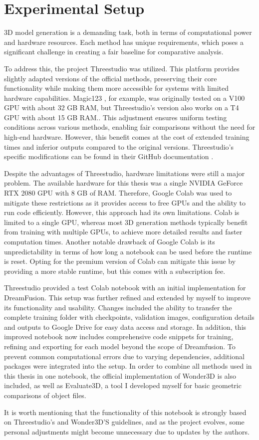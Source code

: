 \section{Experimental Setup}\label{Setup}

3D model generation is a demanding task, both in terms of computational power and hardware resources. Each method has unique requirements, which poses a significant challenge in creating a fair baseline for comparative analysis.

To address this, the project Threestudio \citep{threestudio2023} was utilized. This platform provides slightly adapted versions of the official methods, preserving their core functionality while making them more accessible for systems with limited hardware capabilities. Magic123 \citep{qian2023magic123}, for example, was originally tested on a V100 GPU with about 32 GB RAM, but Threestudio's version also works on a T4 GPU with about 15 GB RAM.\@. This adjustment ensures uniform testing conditions across various methods, enabling fair comparisons without the need for high-end hardware. However, this benefit comes at the cost of extended training times and inferior outputs compared to the original versions. Threestudio's specific modifications can be found in their GitHub documentation \citep{threestudio2023}.

Despite the advantages of Threestudio, hardware limitations were still a major problem. The available hardware for this thesis was a single NVIDIA GeForce RTX 2080 GPU with 8 GB of RAM\@. Therefore, Google Colab \citep{googlecolab} was used to mitigate these restrictions as it provides access to free GPUs and the ability to run code efficiently. However, this approach had its own limitations. Colab is limited to a single GPU, whereas most 3D generation methods typically benefit from training with multiple GPUs, to achieve more detailed results and faster computation times. Another notable drawback of Google Colab is its unpredictability in terms of how long a notebook can be used before the runtime is reset. Opting for the premium version of Colab can mitigate this issue by providing a more stable runtime, but this comes with a subscription fee.

Threestudio provided a test Colab notebook with an initial implementation for DreamFusion. This setup was further refined and extended by myself to improve its functionality and usability. Changes included the ability to transfer the complete training folder with checkpoints, validation images, configuration details and outputs to Google Drive for easy data access and storage. In addition, this improved notebook now includes comprehensive code snippets for training, refining and exporting for each model beyond the scope of Dreamfusion. To prevent common computational errors due to varying dependencies, additional packages were integrated into the setup. In order to combine all methods used in this thesis in one notebook, the official implementation of Wonder3D \citep{long2023wonder3d} is also included, as well as Evaluate3D, a tool I developed myself for basic geometric comparisons of object files.

It is worth mentioning that the functionality of this notebook is strongly based on Threestudio's and Wonder3D'S guidelines, and as the project evolves, some personal adjustments might become unnecessary due to updates by the authors.